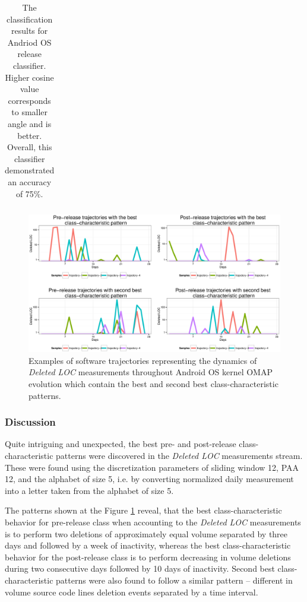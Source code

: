 {\begin{table}[t!]
{{\begin{minipage}[b]{0.47\hsize}
\begin{tabular}{l c c c}
\bottomrule
\end{tabular}
\end{minipage}%
\caption{The classification results for Andriod OS release classifier. Higher cosine value corresponds to smaller angle 
and is better. Overall, this classifier demonstrated an accuracy of 75\%.}
\label{android_table3}
}}
\end{table}
\begin{figure}[h!]
   \centering
   \includegraphics[width=150mm]{figures/omap_deleted_lines_patterns_plot.eps}
   \caption{Examples of software trajectories representing the dynamics of \textit{Deleted LOC} measurements throughout Android OS kernel OMAP evolution which contain the best and second best class-characteristic patterns.}
   \label{fig:OMAP_patterns}
\end{figure}
} %

\subsubsection{Discussion}
Quite intriguing and unexpected, the best pre- and post-release class-characteristic patterns were discovered in the \textit{Deleted LOC} measurements stream. These were found using the discretization parameters of sliding window 12, PAA 12, and the alphabet of size 5, i.e. by converting normalized daily measurement into a letter taken from the alphabet of size 5. 

The patterns shown at the Figure \ref{fig:OMAP_patterns} reveal, that the best class-characteristic behavior for pre-release class when accounting to the \textit{Deleted LOC} measurements is to perform two deletions of approximately equal volume separated by three days and followed by a week of inactivity, whereas the best class-characteristic behavior for the post-release class is to perform decreasing in volume deletions during two consecutive days followed by 10 days of inactivity. Second best class-characteristic patterns were also found to follow a similar pattern -- different in volume source code lines deletion events separated by a time interval.

